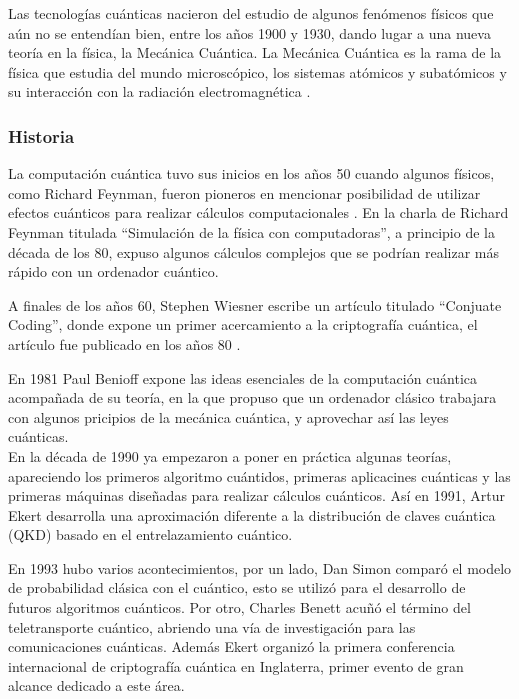 Las tecnologías cuánticas nacieron del estudio de algunos fenómenos físicos que aún no se entendían bien, entre los años 1900 y 1930, dando lugar a una nueva teoría en la física, la Mecánica Cuántica. La Mecánica Cuántica es la rama de la física que estudia del mundo microscópico, los sistemas atómicos y subatómicos y su interacción con la radiación electromagnética \cite{mecanica-cuantica}.\\

\subsubsection{Historia}

La computación cuántica tuvo sus inicios en los años 50 cuando algunos físicos, como Richard Feynman, fueron pioneros en mencionar posibilidad de utilizar efectos cuánticos para realizar cálculos computacionales \cite{computacion-cuantica-wiki}. En la charla de Richard Feynman titulada ``Simulación de la física con computadoras'', a principio de la década de los 80, expuso algunos cálculos complejos que se podrían realizar más rápido con un ordenador cuántico. 


A finales de los años 60, Stephen Wiesner escribe un artículo titulado ``Conjuate Coding'', donde expone un primer acercamiento a la criptografía cuántica, el artículo fue publicado en los años 80 \cite{computacion-cuantica-crono}.

En 1981 Paul Benioff expone las ideas esenciales de la computación cuántica acompañada de su teoría, en la que propuso que un ordenador clásico trabajara con algunos pricipios de la mecánica cuántica, y aprovechar así las leyes cuánticas.\\


En la década de 1990 ya empezaron a poner en práctica algunas teorías, apareciendo los primeros algoritmo cuántidos, primeras aplicacines cuánticas y las primeras máquinas diseñadas para realizar cálculos cuánticos. Así en 1991, Artur Ekert desarrolla una aproximación diferente a la distribución de claves cuántica (QKD) basado en el entrelazamiento cuántico.

En 1993 hubo varios acontecimientos, por un lado, Dan Simon comparó el modelo de probabilidad clásica con el cuántico, esto se utilizó para el desarrollo de futuros algoritmos cuánticos. Por otro, Charles Benett acuñó el término del teletransporte cuántico, abriendo una vía de investigación para las comunicaciones cuánticas. Además Ekert organizó la primera conferencia internacional de criptografía cuántica en Inglaterra, primer evento de gran alcance dedicado a este área.

